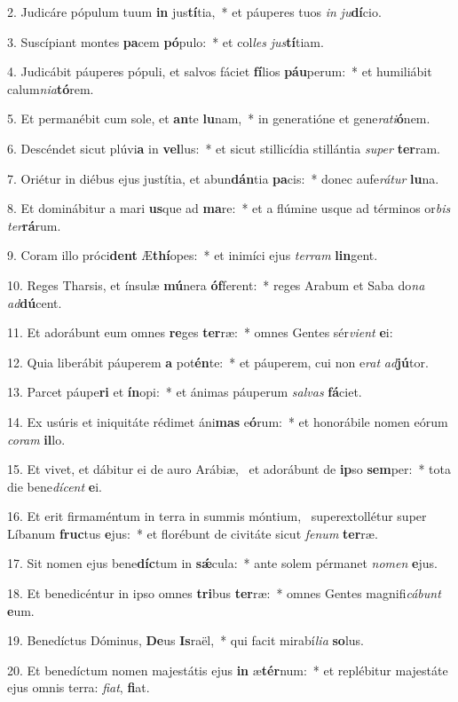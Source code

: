 2. Judicáre pópulum tuum \textbf{in} jus\textbf{tí}tia,~*  et páuperes tuos \textit{in} \textit{ju}\textbf{dí}cio.\

3. Suscípiant montes \textbf{pa}cem \textbf{pó}pulo:~*  et col\textit{les} \textit{jus}\textbf{tí}tiam.\

4. Judicábit páuperes pópuli, et salvos fáciet \textbf{fí}lios \textbf{páu}perum:~*  et humiliábit calum\textit{ni}\textit{a}\textbf{tó}rem.\

5. Et permanébit cum sole, et \textbf{an}te \textbf{lu}nam,~*  in generatióne et gene\textit{ra}\textit{ti}\textbf{ó}nem.\

6. Descéndet sicut plúvi\textbf{a} in \textbf{vel}lus:~*  et sicut stillicídia stillántia \textit{su}\textit{per} \textbf{ter}ram.\

7. Oriétur in diébus ejus justítia, et abun\textbf{dán}tia \textbf{pa}cis:~*  donec aufe\textit{rá}\textit{tur} \textbf{lu}na.\

8. Et dominábitur a mari \textbf{us}que ad \textbf{ma}re:~*  et a flúmine usque ad términos or\textit{bis} \textit{ter}\textbf{rá}rum.\

9. Coram illo próci\textbf{dent} Æ\textbf{thí}opes:~*  et inimíci ejus \textit{ter}\textit{ram} \textbf{lin}gent.\

10. Reges Tharsis, et ínsulæ \textbf{mú}nera \textbf{óf}ferent:~*  reges Arabum et Saba do\textit{na} \textit{ad}\textbf{dú}cent.\

11. Et adorábunt eum omnes \textbf{re}ges \textbf{ter}ræ:~*  omnes Gentes sér\textit{vi}\textit{ent} \textbf{e}i:\

12. Quia liberábit páuperem \textbf{a} pot\textbf{én}te:~*  et páuperem, cui non e\textit{rat} \textit{ad}\textbf{jú}tor.\

13. Parcet páupe\textbf{ri} et \textbf{ín}opi:~*  et ánimas páuperum \textit{sal}\textit{vas} \textbf{fá}ciet.\

14. Ex usúris et iniquitáte rédimet áni\textbf{mas} e\textbf{ó}rum:~*  et honorábile nomen eórum \textit{co}\textit{ram} \textbf{il}lo.\

15. Et vivet, et dábitur ei de auro Arábiæ, \dag\  et adorábunt de \textbf{ip}so \textbf{sem}per:~*  tota die bene\textit{dí}\textit{cent} \textbf{e}i.\

16. Et erit firmaméntum in terra in summis móntium, \dag\  superextollétur super Líbanum \textbf{fruc}tus \textbf{e}jus:~*  et florébunt de civitáte sicut \textit{fe}\textit{num} \textbf{ter}ræ.\

17. Sit nomen ejus bene\textbf{díc}tum in \textbf{sǽ}cula:~*  ante solem pérmanet \textit{no}\textit{men} \textbf{e}jus.\

18. Et benedicéntur in ipso omnes \textbf{tri}bus \textbf{ter}ræ:~*  omnes Gentes magnifi\textit{cá}\textit{bunt} \textbf{e}um.\

19. Benedíctus Dóminus, \textbf{De}us \textbf{Is}raël,~*  qui facit mirabí\textit{li}\textit{a} \textbf{so}lus.\

20. Et benedíctum nomen majestátis ejus \textbf{in} æ\textbf{tér}num:~*  et replébitur majestáte ejus omnis terra: \textit{fi}\textit{at}, \textbf{fi}at.\

